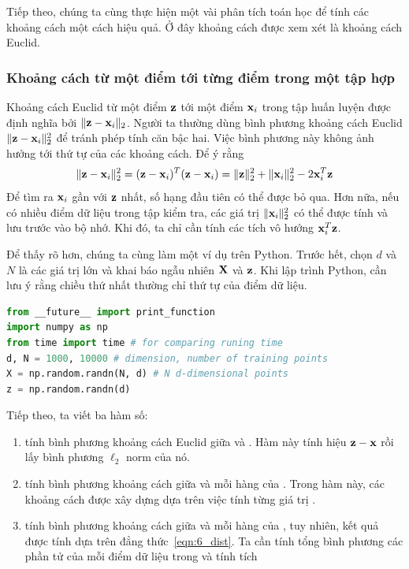 Tiếp theo, chúng ta cùng thực hiện một vài phân tích toán học để tính các khoảng cách một cách hiệu quả. Ở đây khoảng cách được xem xét là khoảng cách Euclid.
\subsubsection{Khoảng cách từ một điểm tới từng điểm trong một tập hợp}
Khoảng cách Euclid từ một điểm $\mathbf{z}$ tới một điểm $\mathbf{x}_i$ trong tập
huấn luyện được định nghĩa bởi $\|\mathbf{z} - \mathbf{x}_i\|_2$. Người ta thường dùng bình phương khoảng cách Euclid $\|\mathbf{z} -\mathbf{x}_i\|_2^2$ để tránh phép tính căn bậc hai. Việc bình phương này không ảnh hưởng tới thứ tự của các khoảng cách. Để ý rằng
\begin{equation}
\label{eqn:6_dist}
\|\mathbf{z} - \mathbf{x}_i\|_2^2 = (\mathbf{z} - \mathbf{x}_i)^T(\mathbf{z} - \mathbf{x}_i) = \|\mathbf{z}\|_2^2 +
\|\mathbf{x}_i\|_2^2 - 2\mathbf{x}_i^T\mathbf{z}
\end{equation}
Để tìm ra $\mathbf{x}_i$ gần với $\mathbf{z}$ nhất, số hạng đầu tiên
có thể được bỏ qua. Hơn nữa, nếu có nhiều điểm dữ liệu trong tập kiểm tra, các
giá trị $\|\mathbf{x}_i\|_2^2$ có thể được tính và lưu trước vào bộ nhớ. Khi đó, ta chỉ
cần tính các tích vô hướng $\mathbf{x}_i^T\mathbf{z}$.

Để thấy rõ hơn, chúng ta cùng làm một ví dụ trên Python. Trước hết, chọn $d$ và
$N$ là các giá trị lớn và khai báo ngẫu nhiên $\mathbf{X}$ và $\mathbf{z}$. Khi lập trình Python, cần lưu ý rằng chiều thứ nhất thường chỉ thứ tự của điểm dữ liệu.
\begin{lstlisting}[language=Python]
from __future__ import print_function
import numpy as np
from time import time # for comparing runing time
d, N = 1000, 10000 # dimension, number of training points
X = np.random.randn(N, d) # N d-dimensional points
z = np.random.randn(d)
\end{lstlisting}

Tiếp theo, ta viết ba hàm số:
\begin{enumerate}

\item {} tính bình phương khoảng cách Euclid giữa  và . Hàm này tính hiệu $\mathbf{z} - \mathbf{x}$ rồi lấy bình phương $\ell_2$ norm của nó.


\item {} tính bình phương khoảng cách giữa
 và mỗi {hàng} của . Trong hàm này,
các khoảng cách được xây dựng dựa trên việc tính từng giá trị
.

\item {} tính bình phương khoảng cách giữa
 và mỗi {hàng} của , tuy nhiên, kết
quả được tính dựa trên đẳng thức~\eqref{eqn:6_dist}. Ta cần tính tổng bình phương các phần tử của mỗi điểm dữ liệu trong  và tính tích 
\end{enumerate}

